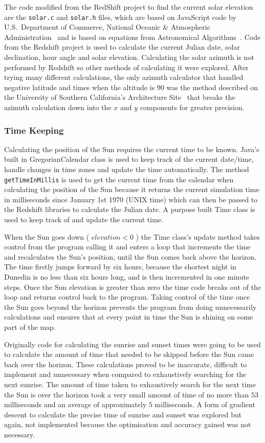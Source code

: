 \documentclass[12pt]{report}
\begin{document}
The code modified from the RedShift project to find the current solar elevation are the \texttt{solar.c} and \texttt{solar.h} files, which are based on JavaScript code by U.S.\ Department of Commerce, National Oceanic {\&} Atmospheric Administration~\cite{usnoaa} and is based on equations from Astronomical Algorithms~\cite{astronomicalalgorithms}. Code from the Redshift project is used to calculate the current Julian date, solar declination, hour angle and solar elevation. Calculating the solar azimuth is not performed by Redshift so other methods of calculating it were explored. After trying many different calculations, the only azimuth calculator that handled negative latitude and times when the altitude is 90{\degree} was the method described on the University of Southern California's Architecture Site~\cite{solarazi} that breaks the azimuth calculation down into the $x$ and $y$ components for greater precision.

\subsubsection{Time Keeping}
Calculating the position of the Sun requires the current time to be known. Java's built in GregorianCalendar class is used to keep track of the current date/time, handle changes in time zones and update the time automatically. The method \texttt{getTimeInMillis} is used to get the current time from the calendar when calculating the position of the Sun because it returns the current simulation time in milliseconds since January 1st 1970 (UNIX time) which can then be passed to the Redshift libraries to calculate the Julian date. A purpose built Time class is used to keep track of and update the current time.

When the Sun goes down ( $\mathit{elevation} < 0$ ) the Time class's update method takes control from the program calling it and enters a loop that increments the time and recalculates the Sun's position, until the Sun comes back above the horizon. The time firstly jumps forward by six hours, because the shortest night in Dunedin is no less than six hours long, and is then incremented in one minute steps. Once the Sun elevation is greater than zero the time code breaks out of the loop and returns control back to the program. Taking control of the time once the Sun goes beyond the horizon prevents the program from doing unnecessarily calculations and ensures that at every point in time the Sun is shining on some part of the map. 

Originally code for calculating the sunrise and sunset times were going to be used to calculate the amount of time that needed to be skipped before the Sun came back over the horizon. These calculations proved to be inaccurate, difficult to implement and unnecessary when compared to exhaustively searching for the next sunrise. The amount of time taken to exhaustively search for the next time the Sun is over the horizon took a very small amount of time of no more than $53$ milliseconds and an average of approximately $5$ milliseconds. A form of gradient descent to calculate the precise time of sunrise and sunset was explored but again, not implemented because the optimisation and accuracy gained was not necessary.
\end{document}
